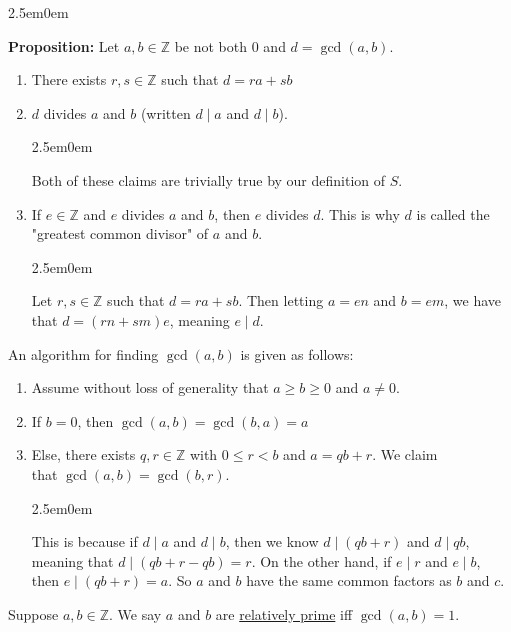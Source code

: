 \documentclass{book}
\newcommand{\hTwo}{%
\color{MidnightBlue}%
   \fontsize{13}{15}\selectfont%
}
\newcommand{\hThree}{%
   \color{PineGreen!85!Orange}
   \fontsize{12}{14}\selectfont%
}
\newenvironment{myIndent}{%
   \begin{adjustwidth}{2.5em}{0em}%
}{%
   \end{adjustwidth}%
}
\newcommand{\udefine}[1]{{%
   \setulcolor{Red}%
   \setul{0.14em}{0.07em}%
   \ul{#1}%
}}
\newcommand{\blab}[1]{\textbf{#1}}
\newcommand{\divides}{\mathop{\mid}}
\newcommand{\retTwo}{\hfill\bigbreak}
\begin{document}
\begin{myIndent}\hTwo
	\blab{Proposition:} Let $a, b \in \mathbb{Z}$ be not both $0$ and $d = \gcd(a, b)$.
	\begin{enumerate}
		\item There exists $r, s \in \mathbb{Z}$ such that $d = ra + sb$
		\item $d$ divides $a$ and $b$ (written $d \divides a$ and $d \divides b$).
		\begin{myIndent}\hThree
			Both of these claims are trivially true by our definition of $S$.\newpage
		\end{myIndent}
		\item If $e \in \mathbb{Z}$ and $e$ divides $a$ and $b$, then $e$ divides $d$. This is why $d$ is called the\\ "greatest common divisor" of $a$ and $b$.
		\begin{myIndent}\hThree
			Let $r, s \in \mathbb{Z}$ such that $d = ra + sb$. Then letting $a = en$ and $b = em$, we have that $d = (rn + sm)e$, meaning $e \divides d$.\retTwo
		\end{myIndent}
	\end{enumerate}
\end{myIndent}

An algorithm for finding $\gcd(a, b)$ is given as follows:
\begin{enumerate}
	\item Assume without loss of generality that $a \geq b \geq 0$ and $a \neq 0$.
	\item If $b = 0$, then $\gcd(a, b) = \gcd(b, a) = a$
	\item Else, there exists $q, r \in \mathbb{Z}$ with $0 \leq r < b$ and $a = qb + r$. We claim\\ that $\gcd(a, b) = \gcd(b, r)$.
	
	\begin{myIndent}\hTwo
		This is because if $d \divides a$ and $d \divides b$, then we know $d \divides (qb + r)$ and $d \divides qb$,\\ meaning that $d \divides (qb + r - qb) = r$. On the other hand, if $e \divides r$ and $e \divides b$,\\ then $e \divides (qb + r) = a$. So $a$ and $b$ have the same common factors as $b$ and $c$.\retTwo
	\end{myIndent}
\end{enumerate}

Suppose $a, b \in \mathbb{Z}$. We say $a$ and $b$ are \udefine{relatively prime} iff $\gcd(a, b) = 1$.
\end{document}
